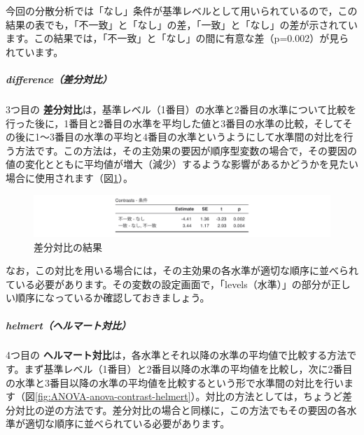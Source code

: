 \documentclass[
  12pt,
  a5jpaper,
  lualatex, ja=standard]{bxjsbook}
\renewcommand{\emph}[1]{\textbf{\color{emph} #1}}
\begin{document}
今回の分散分析では「なし」条件が基準レベルとして用いられているので，この結果の表でも，「不一致」と「なし」の差，「一致」と「なし」の差が示されています。この結果では，「不一致」と「なし」の間に有意な差（p=0.002）が見られています。

\hypertarget{differenceux5deeux5206ux5bfeux6bd4}{%
\subparagraph*{difference（差分対比）}\label{differenceux5deeux5206ux5bfeux6bd4}}

3つ目の\emph{差分対比}は，基準レベル（1番目）の水準と2番目の水準について比較を行った後に，1番目と2番目の水準を平均した値と3番目の水準の比較，そしてその後に1〜3番目の水準の平均と4番目の水準というようにして水準間の対比を行う方法です。この方法は，その主効果の要因が順序型変数の場合で，その要因の値の変化とともに平均値が増大（減少）するような影響があるかどうかを見たい場合に使用されます（図\ref{fig:ANOVA-anova-contrast-difference}）。

\begin{figure}[!ht]

{\centering \includegraphics[width=1\linewidth]{images/ANOVA/anova-contrast-difference} 

}

\caption{差分対比の結果}\label{fig:ANOVA-anova-contrast-difference}
\end{figure}

なお，この対比を用いる場合には，その主効果の各水準が適切な順序に並べられている必要があります。その変数の設定画面で，「levels（水準）」の部分が正しい順序になっているか確認しておきましょう。

\hypertarget{helmertux30d8ux30ebux30deux30fcux30c8ux5bfeux6bd4}{%
\subparagraph*{helmert（ヘルマート対比）}\label{helmertux30d8ux30ebux30deux30fcux30c8ux5bfeux6bd4}}

4つ目の\emph{ヘルマート対比}は，各水準とそれ以降の水準の平均値で比較する方法です。まず基準レベル（1番目）と2番目以降の水準の平均値を比較し，次に2番目の水準と3番目以降の水準の平均値を比較するという形で水準間の対比を行います（図\ref{fig:ANOVA-anova-contrast-helmert}）。対比の方法としては，ちょうど差分対比の逆の方法です。差分対比の場合と同様に，この方法でもその要因の各水準が適切な順序に並べられている必要があります。
\end{document}
